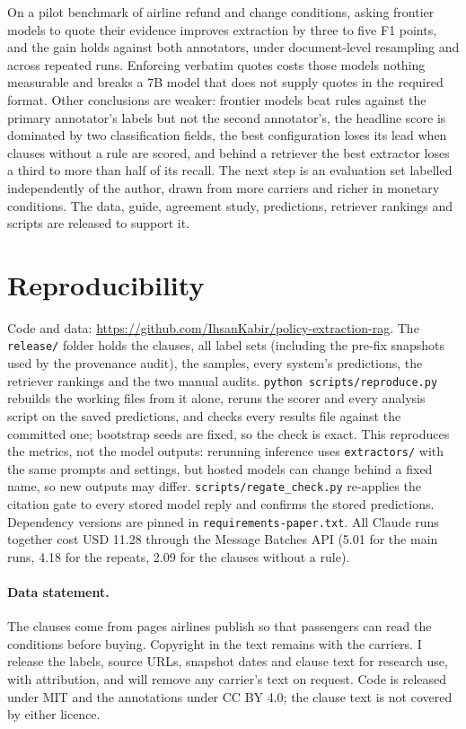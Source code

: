 \documentclass[11pt,a4paper]{article}
\begin{document}
On a pilot benchmark of airline refund and change conditions, asking frontier models to quote their evidence improves extraction by three to five F1 points, and the gain holds against both annotators, under document-level resampling and across repeated runs. Enforcing verbatim quotes costs those models nothing measurable and breaks a 7B model that does not supply quotes in the required format. Other conclusions are weaker: frontier models beat rules against the primary annotator's labels but not the second annotator's, the headline score is dominated by two classification fields, the best configuration loses its lead when clauses without a rule are scored, and behind a retriever the best extractor loses a third to more than half of its recall. The next step is an evaluation set labelled independently of the author, drawn from more carriers and richer in monetary conditions. The data, guide, agreement study, predictions, retriever rankings and scripts are released to support it.

\section*{Reproducibility}

Code and data: \url{https://github.com/IhsanKabir/policy-extraction-rag}. The \texttt{release/} folder holds the clauses, all label sets (including the pre-fix snapshots used by the provenance audit), the samples, every system's predictions, the retriever rankings and the two manual audits. \texttt{python scripts/reproduce.py} rebuilds the working files from it alone, reruns the scorer and every analysis script on the saved predictions, and checks every results file against the committed one; bootstrap seeds are fixed, so the check is exact. This reproduces the metrics, not the model outputs: rerunning inference uses \texttt{extractors/} with the same prompts and settings, but hosted models can change behind a fixed name, so new outputs may differ. \texttt{scripts/regate\_check.py} re-applies the citation gate to every stored model reply and confirms the stored predictions. Dependency versions are pinned in \texttt{requirements-paper.txt}. All Claude runs together cost USD 11.28 through the Message Batches API (5.01 for the main runs, 4.18 for the repeats, 2.09 for the clauses without a rule).

\paragraph{Data statement.} The clauses come from pages airlines publish so that passengers can read the conditions before buying. Copyright in the text remains with the carriers. I release the labels, source URLs, snapshot dates and clause text for research use, with attribution, and will remove any carrier's text on request. Code is released under MIT and the annotations under CC BY 4.0; the clause text is not covered by either licence.
\end{document}

